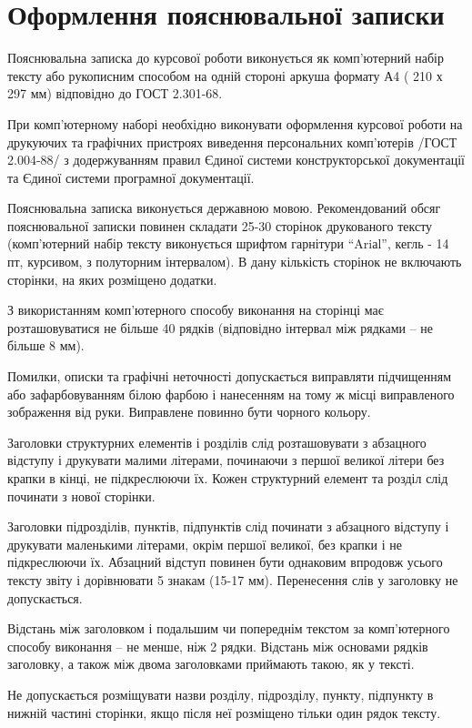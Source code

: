 \chapter{Оформлення пояснювальної записки}
Пояснювальна записка до курсової  роботи виконується як комп’ютерний набір тексту або рукописним способом на одній стороні аркуша формату А4 ( 210 х 297 мм) відповідно до ГОСТ 2.301-68.

При комп’ютерному наборі необхідно виконувати оформлення курсової роботи на друкуючих та графічних пристроях виведення персональних комп’ютерів /ГОСТ 2.004-88/ з додержуванням правил Єдиної системи конструкторської документації та Єдиної системи програмної документації.

Пояснювальна записка виконується державною мовою.
Рекомендований обсяг пояснювальної записки повинен складати 25-30 сторінок друкованого тексту (комп’ютерний набір тексту виконується шрифтом гарнітури “Ariаl”, кегль - 14 пт, курсивом, з полуторним інтервалом).  В дану кількість сторінок не включають сторінки, на яких розміщено додатки.

З використанням  комп’ютерного способу виконання на сторінці має розташовуватися не більше 40 рядків (відповідно інтервал між рядками – не більше 8 мм).

Помилки, описки та графічні неточності допускається виправляти підчищенням або зафарбовуванням білою фарбою і нанесенням на тому ж місці виправленого зображення від руки. Виправлене повинно бути чорного кольору.

Заголовки   структурних елементів  і розділів слід розташовувати з абзацного відступу і друкувати малими  літерами, починаючи з першої великої літери без крапки в кінці, не підкреслюючи їх. Кожен структурний елемент та розділ слід починати з нової сторінки.

Заголовки підрозділів, пунктів, підпунктів слід починати з абзацного відступу і друкувати маленькими літерами, окрім першої великої, без крапки і не підкреслюючи їх. Абзацний відступ повинен бути однаковим впродовж усього тексту звіту і дорівнювати 5 знакам (15-17 мм). Перенесення слів у заголовку не допускається.

Відстань між заголовком і подальшим чи попереднім текстом за комп’ютерного  способу виконання – не менше, ніж 2 рядки.  Відстань між основами рядків заголовку, а також між двома заголовками приймають такою, як у тексті.

Не допускається розміщувати назви розділу, підрозділу, пункту, підпункту в нижній частині сторінки, якщо після неї розміщено тільки один рядок тексту.

